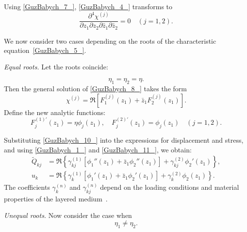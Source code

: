 Using \eqref{GuzBabych_7_}, \eqref{GuzBabych_4_} transforms to
\begin{equation} \label{GuzBabych_8_}
    \frac{\partial^{4} \chi^{(j)} }{\partial z_{1} \partial z_{2} \partial \bar{z}_{1} \partial \bar{z}_{2}} = 0 \quad (j = 1,2).
\end{equation}

We now consider two cases depending on the roots of the characteristic equation~\eqref{GuzBabych_5_}.

\medskip\emph{Equal roots.} Let the roots coincide:

\begin{equation} \label{GuzBabych_9_}
    \eta_{1} = \eta_{2} = \eta.
\end{equation}
%
Then the general solution of \eqref{GuzBabych_8_} takes the form
\begin{equation} \label{GuzBabych_10_}
    \chi^{(j)} = \Re\left[ F_{1}^{(j)}(z_{1}) + \bar{z}_{1} F_{2}^{(j)}(z_{1}) \right].
\end{equation}
%
Define the new analytic functions:
\begin{equation} \label{GuzBabych_11_}
    F_{j}^{(1)\prime}(z_{1}) = \eta \phi_{j}(z_{1}), \quad
    F_{j}^{(2)\prime}(z_{1}) = \phi_{j}(z_{1}) \quad (j = 1,2).
\end{equation}

Substituting \eqref{GuzBabych_10_} into the expressions for displacement and stress, and using \eqref{GuzBabych_1_} and \eqref{GuzBabych_11_}, we obtain:
\begin{equation} \label{GuzBabych_12_}
    \begin{aligned}
        \tilde{Q}_{kj} &= \Re \left\{ \gamma_{kj}^{(1)} \left[ \phi_{1}''(z_{1}) + \bar{z}_{1} \phi_{2}''(z_{1}) \right]
        + \gamma_{kj}^{(2)} \phi_{2}'(z_{1}) \right\}, \\
        u_{k} &= \Re \left\{ \gamma_{k}^{(1)} \left[ \phi_{1}'(z_{1}) + \bar{z}_{1} \phi_{2}'(z_{1}) \right]
        + \gamma_{k}^{(2)} \phi_{2}(z_{1}) \right\}.
    \end{aligned}
\end{equation}
%
The coefficients $\gamma_{k}^{(n)}$ and $\gamma_{kj}^{(n)}$ depend on the loading conditions and material properties of the layered medium~\cite{GuzBabych10}.

\medskip\emph{Unequal roots.} Now consider the case when
\begin{equation} \label{GuzBabych_13_}
    \eta_{1} \ne \eta_{2}.
\end{equation}

